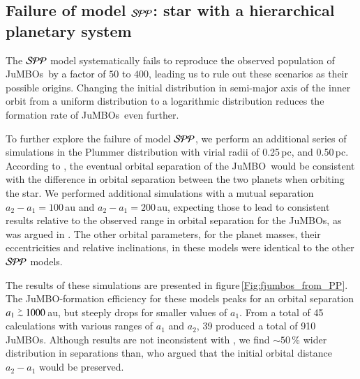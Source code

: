 \documentclass[submission,phys]{lib/SciPost}
\def\apgt{\ {\raise-.5ex\hbox{$\buildrel>\over\sim$}}\ }
\newcommand{\jumbo}{\mbox{JuMBO}}
\newcommand{\jumbos}{\mbox{JuMBOs}}
\begin{document}
\subsection{Failure of model ${\cal SPP}$: star with a hierarchical planetary system}\label{Sect:Failure_SPP}

The ${\cal SPP}$ model systematically fails to reproduce the observed
population of \jumbos\, by a factor of $50$ to $400$, leading us to rule out
these scenarios as their possible origins. Changing the initial
distribution in semi-major axis of the inner orbit from a uniform
distribution to a logarithmic distribution reduces the formation rate
of \jumbos\, even further.

To further explore the failure of model ${\cal SPP}$, we perform an
additional series of simulations in the Plummer distribution with
virial radii of 0.25\,pc, and 0.50\,pc.  According to
\cite{2023arXiv231006016W}, the eventual orbital separation of the
\jumbo\, would be consistent with the difference in orbital separation
between the two planets when orbiting the star.  We performed
additional simulations with a mutual separation $a_2-a_1 = 100$\,au and
$a_2-a_1 = 200$\,au, expecting those to lead to consistent results relative to
the observed range in orbital separation for the
\jumbos, as was argued in \cite{2023arXiv231006016W}.  The other
orbital parameters, for the planet masses, their eccentricities and
relative inclinations, in these models were identical to the other
${\cal SPP}$ models.

The results of these simulations are presented in
figure\,\ref{Fig:fjumbos_from_PP}.  The \jumbo-formation efficiency
for these models peaks for an orbital separation $a_1 \apgt 1000$\,au,
but steeply drops for smaller values of $a_1$.  From a total of 45
calculations with various ranges of $a_1$ and $a_2$, 39 produced a
total of 910 \jumbos.  Although results are not inconsistent with
\cite{2023arXiv231006016W}, we find $\sim 50$\,\% wider distribution
in separations than\cite{2023arXiv231006016W}, who argued that the
initial orbital distance $a_2-a_1$ would be preserved.
\end{document}
